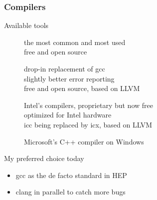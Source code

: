 \begin{frame}[fragile]
  \frametitle{Compilers}
  \begin{block}{Available tools}
    \begin{description}
    \item[\href{http://gcc.gnu.org/}{}]
        the most common and most used\\
        free and open source
    \item[\href{http://clang.llvm.org/}{}]
        drop-in replacement of gcc \\
        slightly better error reporting \\
        free and open source, based on LLVM
    \item[\href{https://www.intel.com/content/www/us/en/developer/tools/oneapi/dpc-compiler.html\#gs.dyllp0}{ }]
        Intel's compilers, proprietary but now free \\
        optimized for Intel hardware \\
        icc being replaced by icx, based on LLVM
    \item[\href{https://visualstudio.microsoft.com/}{}]
      Microsoft's C++ compiler on Windows
    \end{description}
  \end{block}
  \begin{alertblock}{My preferred choice today}
    \begin{itemize}
      \item \alert{gcc} as the de facto standard in HEP
      \item \hspace{0pt}\alert{clang} in parallel to catch more bugs
    \end{itemize}
  \end{alertblock}
\end{frame}


